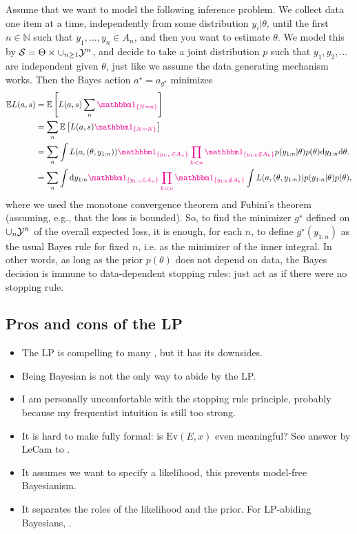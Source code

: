 Assume that we want to model the following inference problem.
We collect data one item at a time, independently from some distribution $y_i\vert\theta$, until the first $n\in\mathbb{N}$ such that $y_1,\dots,y_n \in A_n$, and then you want to estimate $\theta$. 
We model this by $\mathcal{S} = \Theta \times \cup_{n\geq 1} \mathcal{Y}^n$, and decide to take a joint distribution $p$  such that $y_1,y_2,\dots$ are independent given $\theta$, just like we assume the data generating mechanism works. 
Then the Bayes action $a^\star = a_{g^\star}$ minimizes
\begin{align*}
   \mathbb E L(a,s) &= \mathbb E \left [ L(a,s) \sum_{n} \un{\IND{N=n}} \right ]\\
    &= \sum_{n} \mathbb E \left [ L(a,s) \un{\IND{N=N}} \right ]\\
    &= \sum_{n} \int L(a,(\theta,y_{1:n})) \un{\IND{y_{1:n}\in A_n}\prod_{k<n}\IND{y_{1:k}\notin A_k}} p(y_{1:n}\vert\theta) p(\theta) \d y_{1:n}\d \theta.\\
    &= \sum_n \int\d y_{1:n} \un{\IND{y_{1:n}\in A_n}\prod_{k<n}\IND{y_{1:k} \notin A_k}} \int  L(a,(\theta,y_{1:n}))  p(y_{1:n}\vert\theta) p(\theta),
\end{align*}
where we used the monotone convergence theorem and Fubini's theorem (assuming, e.g., that the loss is bounded).
So, to find the minimizer $g^\star$ defined on $\cup_n \mathcal{Y}^n$ of the overall expected loss, it is enough, for each $n$, to define $g^\star(y_{1:n})$ as the usual Bayes rule for fixed $n$, i.e. as the minimizer of the inner integral.
In other words, as long as the prior $p(\theta)$ does not depend on data, the Bayes decision is immune to data-dependent stopping rules: just act as if there were no stopping rule.

\subsection{Pros and cons of the LP}
\begin{itemize}
  \item The LP is compelling to many \citep{BeWo88}, but it has its downsides.
  \item Being Bayesian is not the only way to abide by the LP.
  \item I am personally uncomfortable with the stopping rule principle, probably because my frequentist intuition is still too strong.
  \item It is hard to make fully formal: is $\text{Ev}(E,x)$ even meaningful? See answer by LeCam to \citep{BeWo88}.
  \item It assumes we want to specify a likelihood, this prevents model-free Bayesianism.
  \item It separates the roles of the likelihood and the prior. For LP-abiding Bayesians, .
\end{itemize}

